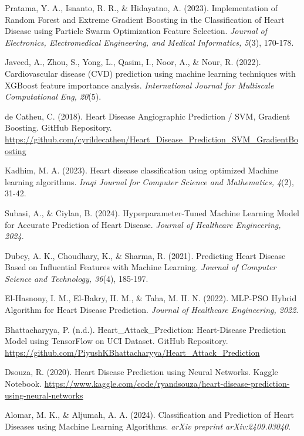 \documentclass{article}
\begin{document}
\begin{thebibliography}{99}
    Pratama, Y. A., Isnanto, R. R., \& Hidayatno, A. (2023). Implementation of Random Forest and Extreme Gradient Boosting in the Classification of Heart Disease using Particle Swarm Optimization Feature Selection. \textit{Journal of Electronics, Electromedical Engineering, and Medical Informatics, 5}(3), 170-178.

    Javeed, A., Zhou, S., Yong, L., Qasim, I., Noor, A., \& Nour, R. (2022). Cardiovascular disease (CVD) prediction using machine learning techniques with XGBoost feature importance analysis. \textit{International Journal for Multiscale Computational Eng, 20}(5).

    de Catheu, C. (2018). Heart Disease Angiographic Prediction / SVM, Gradient Boosting. GitHub Repository. \url{https://github.com/cyrildecatheu/Heart_Disease_Prediction_SVM_GradientBoosting}

    Kadhim, M. A. (2023). Heart disease classification using optimized Machine learning algorithms. \textit{Iraqi Journal for Computer Science and Mathematics, 4}(2), 31-42.

    Subasi, A., \& Ciylan, B. (2024). Hyperparameter-Tuned Machine Learning Model for Accurate Prediction of Heart Disease. \textit{Journal of Healthcare Engineering, 2024}.

    Dubey, A. K., Choudhary, K., \& Sharma, R. (2021). Predicting Heart Disease Based on Influential Features with Machine Learning. \textit{Journal of Computer Science and Technology, 36}(4), 185-197.

    El-Hasnony, I. M., El-Bakry, H. M., \& Taha, M. H. N. (2022). MLP-PSO Hybrid Algorithm for Heart Disease Prediction. \textit{Journal of Healthcare Engineering, 2022}.

    Bhattacharyya, P. (n.d.). Heart\_Attack\_Prediction: Heart-Disease Prediction Model using TensorFlow on UCI Dataset. GitHub Repository. \url{https://github.com/PiyushKBhattacharyya/Heart_Attack_Prediction}

    Dsouza, R. (2020). Heart Disease Prediction using Neural Networks. Kaggle Notebook. \url{https://www.kaggle.com/code/ryandsouza/heart-disease-prediction-using-neural-networks}

    Alomar, M. K., \& Aljumah, A. A. (2024). Classification and Prediction of Heart Diseases using Machine Learning Algorithms. \textit{arXiv preprint arXiv:2409.03040}.


\end{thebibliography}
\end{document}
